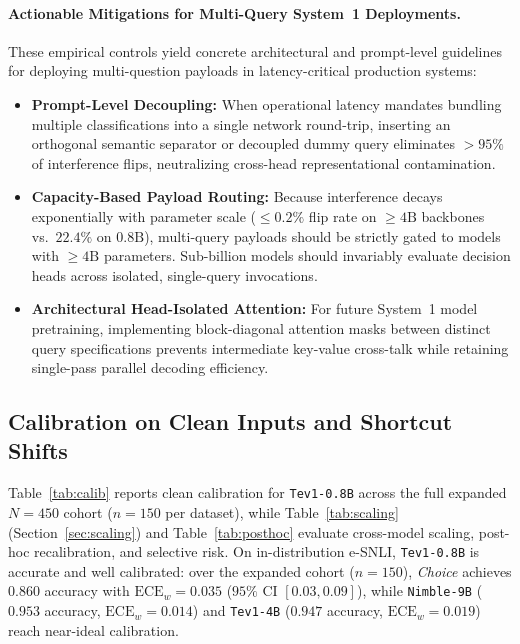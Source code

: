 \documentclass[10pt]{article}
\begin{document}
\paragraph{Actionable Mitigations for Multi-Query System~1 Deployments.}
These empirical controls yield concrete architectural and prompt-level guidelines for deploying multi-question payloads in latency-critical production systems:
\begin{itemize}
\item \textbf{Prompt-Level Decoupling:} When operational latency mandates bundling multiple classifications into a single network round-trip, inserting an orthogonal semantic separator or decoupled dummy query eliminates $>95\%$ of interference flips, neutralizing cross-head representational contamination.
\item \textbf{Capacity-Based Payload Routing:} Because interference decays exponentially with parameter scale ($\le 0.2\%$ flip rate on $\ge 4\text{B}$ backbones vs.\ $22.4\%$ on $0.8\text{B}$), multi-query payloads should be strictly gated to models with $\ge 4\text{B}$ parameters. Sub-billion models should invariably evaluate decision heads across isolated, single-query invocations.
\item \textbf{Architectural Head-Isolated Attention:} For future System~1 model pretraining, implementing block-diagonal attention masks between distinct query specifications prevents intermediate key-value cross-talk while retaining single-pass parallel decoding efficiency.
\end{itemize}

\begin{table}[t]
\centering
\caption{Cross-question interference controls across open-weight System~1 decision models ($N=450$ clean inputs): question serialization ordering ($C \to N$ vs.\ $N \to C$), option list permutation, and prompt length control using an irrelevant neutral dummy question.}
\label{tab:interference_controls}
\resizebox{\textwidth}{!}{}
\end{table}

\subsection{Calibration on Clean Inputs and Shortcut Shifts}
Table~\ref{tab:calib} reports clean calibration for \texttt{Tev1-0.8B} across the full expanded $N=450$ cohort ($n=150$ per dataset), while Table~\ref{tab:scaling} (Section~\ref{sec:scaling}) and Table~\ref{tab:posthoc} evaluate cross-model scaling, post-hoc recalibration, and selective risk.
On in-distribution e-SNLI, \texttt{Tev1-0.8B} is accurate and well calibrated: over the expanded cohort ($n=150$), \emph{Choice} achieves $0.860$ accuracy with $\text{ECE}_w = 0.035$ ($95\%$ CI $[0.03, 0.09]$), while \texttt{Nimble-9B} ($0.953$ accuracy, $\text{ECE}_w = 0.014$) and \texttt{Tev1-4B} ($0.947$ accuracy, $\text{ECE}_w = 0.019$) reach near-ideal calibration.
\end{document}
